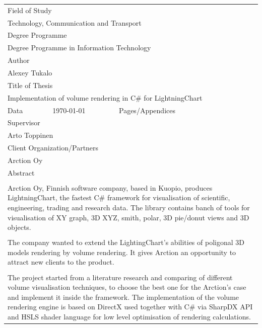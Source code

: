 \documentclass[english]{article}
\begin{document}
\begin{table}
\begin{tabular}{| p{2cm} | p{3cm} | p{4cm} | p{4cm} |}
\hline
\multicolumn{4}{|l|}{Field of Study}\\
\multicolumn{4}{|l|}{Technology, Communication and Transport}\\
\hline
\multicolumn{4}{|l|}{Degree Programme}\\
\multicolumn{4}{|l|}{Degree Programme in Information Technology}\\
\hline
\multicolumn{4}{|l|}{Author}\\
\multicolumn{4}{|l|}{Alexey Tukalo}\\
\hline
\multicolumn{4}{|l|}{Title of Thesis}\\
\multicolumn{4}{|l|}{Implementation of volume rendering in C\# for LightningChart}\\
\hline
Data & \today & Pages/Appendices & \pageref{LastPage}\\
\hline
\multicolumn{4}{|l|}{Supervisor}\\
\multicolumn{4}{|l|}{Arto Toppinen}\\
\hline
\multicolumn{4}{|l|}{Client Organization/Partners}\\
\multicolumn{4}{|l|}{Arction Oy}\\
\hline
\multicolumn{4}{|l|}{Abstract}\\
\multicolumn{4}{|l|}{ }\\
\multicolumn{4}{|p{13cm}|}{
Arction Oy, Finnish software company, based in Kuopio, produces LightningChart, the fastest C\# framework for visualisation of scientific, engineering, trading and research data. The library contains banch of tools for visualisation of XY graph, 3D XYZ, smith, polar, 3D pie/donut views and 3D objects.
}\\
\multicolumn{4}{|l|}{ }\\
\multicolumn{4}{|p{13cm}|}{
The company wanted to extend the LightingChart's abilities of poligonal 3D models rendering by volume rendering. It gives Arction an opportunity to attract new clients to the product.
}\\
\multicolumn{4}{|l|}{ }\\
\multicolumn{4}{|p{13cm}|}{
The project started from a literature research and comparing of different volume visualisation techniques, to choose the best one for the Arction's case and implement it inside the framework. The implementation of the volume rendering engine is based on DirectX used together with C\# via SharpDX API and HSLS shader language for low level optimisation of rendering calculations.
}
\end{tabular}
\end{table}
\end{document}
